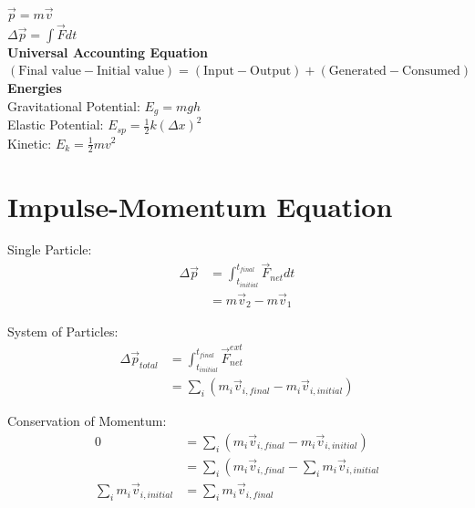 \documentclass{article}
\begin{document}
$\vec{p} = m \vec{v}$ \\
$\Delta \vec{p} = \int\vec{F}dt$ \\

\textbf{Universal Accounting Equation} \\
$(\text{Final value} - \text{Initial value}) = (\text{Input} - \text{Output}) + (\text{Generated} - \text{Consumed})$ \\

\textbf{Energies} \\
Gravitational Potential: $E_g = mgh$ \\
Elastic Potential: $E_{sp} = \frac{1}{2} k (\Delta x)^2$ \\
Kinetic: $E_k = \frac{1}{2}mv^2$ \\

\clearpage


\section*{Impulse-Momentum Equation}
Single Particle:
\begin{align*}
    \Delta\vec{p} &= \int_{t_{initial}}^{t_{final}} \vec{F}_{net} dt  \\
                  &= m\vec{v}_2 - m\vec{v}_1
\end{align*}

System of Particles: 
\begin{align*}
    \Delta\vec{p}_{total} &= \int_{t_{initial}}^{t_{final}} \vec{F}_{net}^{ext} \\
                          &= \sum_i \left( m_i\vec{v}_{i, final} - m_i\vec{v}_{i, initial} \right)
\end{align*}

Conservation of Momentum:
\begin{align*}
    0                              &= \sum_i \left( m_i\vec{v}_{i, final} - m_i\vec{v}_{i, initial} \right) \\
                                   &= \sum_i \left( m_i\vec{v}_{i, final} - \sum_i m_i\vec{v}_{i, initial} \\
    \sum_i m_i\vec{v}_{i, initial} &= \sum_i m_i\vec{v}_{i, final}
\end{align*}

\clearpage

\end{document}
